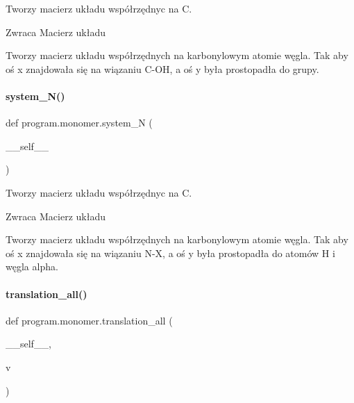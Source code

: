 Tworzy macierz układu współrzędnyc na C. 

\begin{DoxyReturn}{Zwraca}
Macierz układu \begin{DoxyVerb}Tworzy macierz układu współrzędnych na karbonylowym atomie węgla. Tak aby oś x znajdowała się na wiązaniu C-OH, a oś y była prostopadła do grupy.
\end{DoxyVerb}
 
\end{DoxyReturn}
\mbox{\label{classprogram_1_1monomer_a1889e4f5eeb57a26cc29fb0372dea131}} 
\paragraph{system\+\_\+\+N()}
{\footnotesize\ttfamily def program.\+monomer.\+system\+\_\+N (\begin{DoxyParamCaption}\item[{}]{\+\_\+\+\_\+self\+\_\+\+\_\+ }\end{DoxyParamCaption})}



Tworzy macierz układu współrzędnyc na C. 

\begin{DoxyReturn}{Zwraca}
Macierz układu \begin{DoxyVerb}Tworzy macierz układu współrzędnych na karbonylowym atomie węgla. Tak aby oś x znajdowała się na wiązaniu N-X, a oś y była prostopadła do atomów H i węgla alpha.
\end{DoxyVerb}
 
\end{DoxyReturn}
\mbox{\label{classprogram_1_1monomer_a0a1c5332ae16e0ce57bc81746800dafc}} 
\paragraph{translation\+\_\+all()}
{\footnotesize\ttfamily def program.\+monomer.\+translation\+\_\+all (\begin{DoxyParamCaption}\item[{}]{\+\_\+\+\_\+self\+\_\+\+\_\+,  }\item[{}]{v }\end{DoxyParamCaption})}



